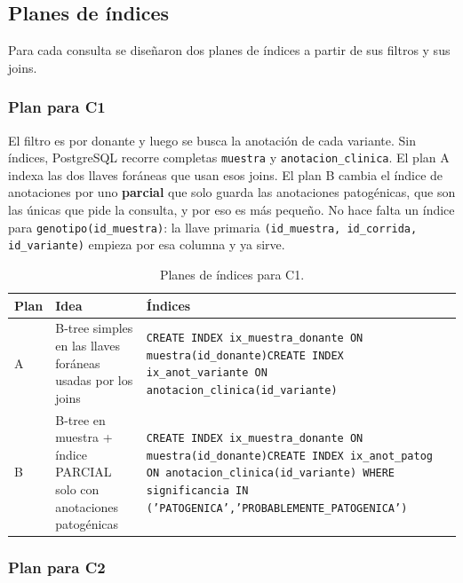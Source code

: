 \subsection{Planes de índices}

Para cada consulta se diseñaron dos planes de índices a partir de sus filtros y sus joins.
\subsubsection{Plan para C1}

El filtro es por donante y luego se busca la anotación de cada variante. Sin índices, PostgreSQL recorre completas \texttt{muestra} y \texttt{anotacion\_\allowbreak{}clinica}. El plan A indexa las dos llaves foráneas que usan esos joins. El plan B cambia el índice de anotaciones por uno \textbf{parcial} que solo guarda las anotaciones patogénicas, que son las únicas que pide la consulta, y por eso es más pequeño. No hace falta un índice para \texttt{genotipo(id\_\allowbreak{}muestra)}: la llave primaria \texttt{(id\_\allowbreak{}muestra, id\_\allowbreak{}corrida, id\_\allowbreak{}variante)} empieza por esa columna y ya sirve.

\begin{table}[H]
\centering\footnotesize
\begin{tabular}{@{}>{\raggedright\arraybackslash}p{0.8cm}>{\raggedright\arraybackslash}p{3.9cm}>{\raggedright\arraybackslash}p{9.4cm}@{}}
\toprule
Plan & Idea & Índices \\
\midrule
A & B-tree simples en las llaves foráneas usadas por los joins & \texttt{CREATE INDEX ix\_\allowbreak{}muestra\_\allowbreak{}donante ON muestra(id\_\allowbreak{}donante)}\newline \texttt{CREATE INDEX ix\_\allowbreak{}anot\_\allowbreak{}variante ON anotacion\_\allowbreak{}clinica(id\_\allowbreak{}variante)} \\
B & B-tree en muestra + índice PARCIAL solo con anotaciones patogénicas & \texttt{CREATE INDEX ix\_\allowbreak{}muestra\_\allowbreak{}donante ON muestra(id\_\allowbreak{}donante)}\newline \texttt{CREATE INDEX ix\_\allowbreak{}anot\_\allowbreak{}patog ON anotacion\_\allowbreak{}clinica(id\_\allowbreak{}variante) WHERE significancia IN ('PATOGENICA','PROBABLEMENTE\_\allowbreak{}PATOGENICA')} \\
\bottomrule
\end{tabular}
\caption{Planes de índices para C1.}
\end{table}
\subsubsection{Plan para C2}

